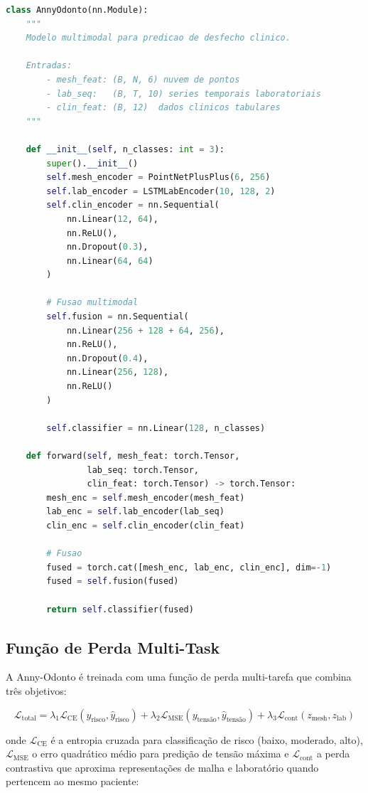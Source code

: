 \begin{lstlisting}[language=Python, caption=Arquitetura Anny-Odonto em PyTorch, label=code:anny-odonto]
class AnnyOdonto(nn.Module):
    """
    Modelo multimodal para predicao de desfecho clinico.

    Entradas:
        - mesh_feat: (B, N, 6) nuvem de pontos
        - lab_seq:   (B, T, 10) series temporais laboratoriais
        - clin_feat: (B, 12)  dados clinicos tabulares
    """

    def __init__(self, n_classes: int = 3):
        super().__init__()
        self.mesh_encoder = PointNetPlusPlus(6, 256)
        self.lab_encoder = LSTMLabEncoder(10, 128, 2)
        self.clin_encoder = nn.Sequential(
            nn.Linear(12, 64),
            nn.ReLU(),
            nn.Dropout(0.3),
            nn.Linear(64, 64)
        )

        # Fusao multimodal
        self.fusion = nn.Sequential(
            nn.Linear(256 + 128 + 64, 256),
            nn.ReLU(),
            nn.Dropout(0.4),
            nn.Linear(256, 128),
            nn.ReLU()
        )

        self.classifier = nn.Linear(128, n_classes)

    def forward(self, mesh_feat: torch.Tensor,
                lab_seq: torch.Tensor,
                clin_feat: torch.Tensor) -> torch.Tensor:
        mesh_enc = self.mesh_encoder(mesh_feat)
        lab_enc = self.lab_encoder(lab_seq)
        clin_enc = self.clin_encoder(clin_feat)

        # Fusao
        fused = torch.cat([mesh_enc, lab_enc, clin_enc], dim=-1)
        fused = self.fusion(fused)

        return self.classifier(fused)
\end{lstlisting}

\subsection{Função de Perda Multi-Task}
\label{subsec:perda-multitask}

A Anny-Odonto é treinada com uma função de perda multi-tarefa que combina três objetivos:

\begin{equation}
\label{eq:loss-multitask}
\mathcal{L}_{\text{total}} = \lambda_1 \mathcal{L}_{\text{CE}}(y_{\text{risco}}, \hat{y}_{\text{risco}}) + \lambda_2 \mathcal{L}_{\text{MSE}}(y_{\text{tensão}}, \hat{y}_{\text{tensão}}) + \lambda_3 \mathcal{L}_{\text{cont}}(z_{\text{mesh}}, z_{\text{lab}})
\end{equation}

onde $\mathcal{L}_{\text{CE}}$ é a entropia cruzada para classificação de risco (baixo, moderado, alto), $\mathcal{L}_{\text{MSE}}$ o erro quadrático médio para predição de tensão máxima e $\mathcal{L}_{\text{cont}}$ a perda contrastiva que aproxima representações de malha e laboratório quando pertencem ao mesmo paciente:

